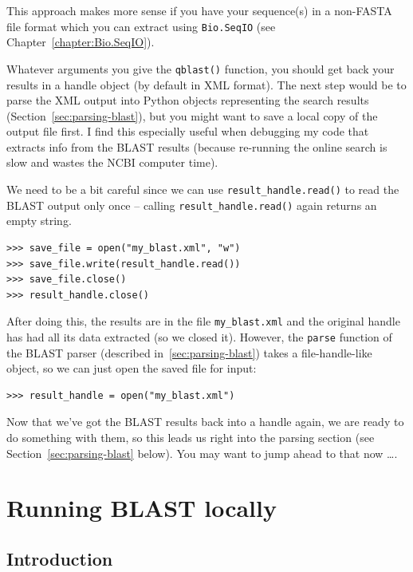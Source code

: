\documentclass{report}
\begin{document}
This approach makes more sense if you have your sequence(s) in a
non-FASTA file format which you can extract using \verb|Bio.SeqIO|
(see Chapter~\ref{chapter:Bio.SeqIO}).

Whatever arguments you give the \verb|qblast()| function, you should
get back your results in a handle object (by default in XML format).
The next step would be to parse the XML output into Python objects
representing the search results (Section~\ref{sec:parsing-blast}),
but you might want to save a local copy of the output file first.
I find this especially useful when debugging my code that extracts
info from the BLAST results (because re-running the online search
is slow and wastes the NCBI computer time).

\label{sec:saving-blast-output}

We need to be a bit careful since we can use \verb|result_handle.read()| to
read the BLAST output only once -- calling \verb|result_handle.read()| again
returns an empty string.

\begin{verbatim}
>>> save_file = open("my_blast.xml", "w")
>>> save_file.write(result_handle.read())
>>> save_file.close()
>>> result_handle.close()
\end{verbatim}

After doing this, the results are in the file \verb|my_blast.xml| and the
original handle has had all its data extracted (so we closed it). However,
the \verb|parse| function of the BLAST parser (described
in~\ref{sec:parsing-blast}) takes a file-handle-like object, so
we can just open the saved file for input:

\begin{verbatim}
>>> result_handle = open("my_blast.xml")
\end{verbatim}

Now that we've got the BLAST results back into a handle again, we are ready
to do something with them, so this leads us right into the parsing section
(see Section~\ref{sec:parsing-blast} below). You may want to jump ahead to
that now \ldots.

\section{Running BLAST locally}
\label{sec:running-local-blast}

\subsection{Introduction}
\end{document}
